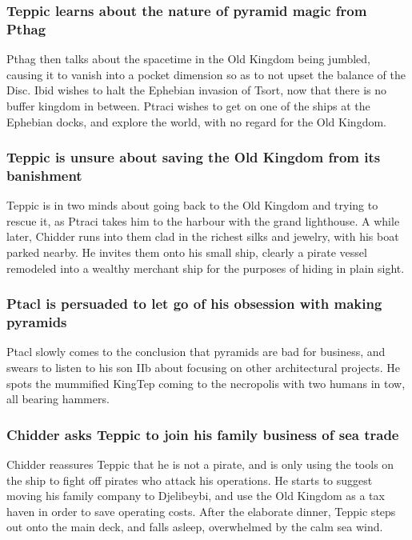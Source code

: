 \subsubsection{\Gls{Teppic} learns about the nature of pyramid magic from \Gls{Pthag}}
\Gls{Pthag} then talks about the spacetime in the Old Kingdom being jumbled, causing it to vanish
into a pocket dimension so as to not upset the balance of the Disc. \Gls{Ibid} wishes to halt the
Ephebian invasion of Tsort, now that there is no buffer kingdom in between. \Gls{Ptraci} wishes to
get on one of the ships at the Ephebian docks, and explore the world, with no regard for the Old
Kingdom.

\subsubsection{\Gls{Teppic} is unsure about saving the Old Kingdom from its banishment}
\Gls{Teppic} is in two minds about going back to the Old Kingdom and trying to rescue it, as
\Gls{Ptraci} takes him to the harbour with the grand lighthouse. A while later, \Gls{Chidder} runs
into them clad in the richest silks and jewelry, with his boat parked nearby. He invites them onto
his small ship, clearly a pirate vessel remodeled into a wealthy merchant ship for the purposes of
hiding in plain sight.

\subsubsection{\Gls{Ptacl} is persuaded to let go of his obsession with making pyramids}
\Gls{Ptacl} slowly comes to the conclusion that pyramids are bad for business, and swears to listen
to his son \Gls{IIb} about focusing on other architectural projects. He spots the mummified
\Gls{KingTep} coming to the necropolis with two humans in tow, all bearing hammers.

\subsubsection{\Gls{Chidder} asks \Gls{Teppic} to join his family business of sea trade}
\Gls{Chidder} reassures \Gls{Teppic} that he is not a pirate, and is only using the tools on the
ship to fight off pirates who attack his operations. He starts to suggest moving his family company
to Djelibeybi, and use the Old Kingdom as a tax haven in order to save operating costs. After the
elaborate dinner, \Gls{Teppic} steps out onto the main deck, and falls asleep, overwhelmed by the
calm sea wind.

